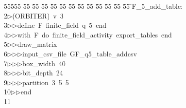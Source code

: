 %
%
\begin{tabbing}
55555 \= 55 \= 55 \= 55 \= 55 \= 55 \= 55 \= 55 \= 55 \= 55 \= 55 \= 55 \= 55 \= \>F\_5\_add\_table:\\[0pt]
2\>$\triangleright$\>(ORBITER)\ v\ 3\ \\[0pt]
3\>$\triangleright$\>$\triangleright$\>define\ F\ finite\_field\ q\ 5\ end\ \\[0pt]
4\>$\triangleright$\>$\triangleright$\>with\ F\ do\ finite\_field\_activity\ export\_tables\ end\ \\[0pt]
5\>$\triangleright$\>$\triangleright$\>draw\_matrix\ \\[0pt]
6\>$\triangleright$\>$\triangleright$\>$\triangleright$\>input\_csv\_file\ GF\_q5\_table\_addcsv\ \\[0pt]
7\>$\triangleright$\>$\triangleright$\>$\triangleright$\>box\_width\ 40\ \\[0pt]
8\>$\triangleright$\>$\triangleright$\>$\triangleright$\>bit\_depth\ 24\ \\[0pt]
9\>$\triangleright$\>$\triangleright$\>$\triangleright$\>partition\ 3\ 5\ 5\ \\[0pt]
10\>$\triangleright$\>$\triangleright$\>end\ \\[0pt]
11\>\end{tabbing}
